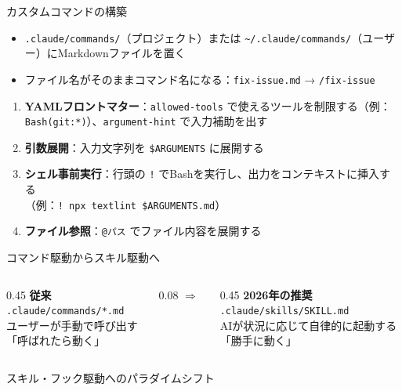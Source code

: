 \documentclass[aspectratio=169,11pt]{beamer}
\newcommand{\cmd}[1]{\texttt{#1}}
\newcommand{\home}{\textasciitilde}
\begin{document}
\begin{frame}{カスタムコマンドの構築}
  \begin{itemize}
    \item \cmd{.claude/commands/}（プロジェクト）または \cmd{\home/.claude/commands/}（ユーザー）にMarkdownファイルを置く
    \item ファイル名がそのままコマンド名になる：\cmd{fix-issue.md} → \cmd{/fix-issue}\cite{r6}
  \end{itemize}
  \vspace{0.3em}
  \begin{enumerate}
    \item \textbf{YAMLフロントマター}：\cmd{allowed-tools} で使えるツールを制限する（例：\cmd{Bash(git:*)}）、\cmd{argument-hint} で入力補助を出す\cite{r7}
    \item \textbf{引数展開}：入力文字列を \cmd{\$ARGUMENTS} に展開する
    \item \textbf{シェル事前実行}：行頭の \cmd{!} でBashを実行し、出力をコンテキストに挿入する\\
      （例：\cmd{!~npx textlint \$ARGUMENTS.md}）
    \item \textbf{ファイル参照}：\cmd{@パス} でファイル内容を展開する
  \end{enumerate}
\end{frame}

\begin{frame}{コマンド駆動からスキル駆動へ}
  \begin{columns}[c]
    \begin{column}{0.45\textwidth}
      \centering
      \textbf{従来}\\[0.3em]
      \cmd{.claude/commands/*.md}\\[0.3em]
      ユーザーが手動で呼び出す\\
      「呼ばれたら動く」
    \end{column}
    \begin{column}{0.08\textwidth}
      \centering\Huge$\Rightarrow$
    \end{column}
    \begin{column}{0.45\textwidth}
      \centering
      \textbf{2026年の推奨}\\[0.3em]
      \cmd{.claude/skills/SKILL.md}\\[0.3em]
      AIが状況に応じて自律的に起動する\\
      「勝手に動く」
    \end{column}
  \end{columns}
  \vspace{1em}
  \begin{center}
    スキル・フック駆動へのパラダイムシフト\cite{r9}
  \end{center}
\end{frame}
\end{document}

